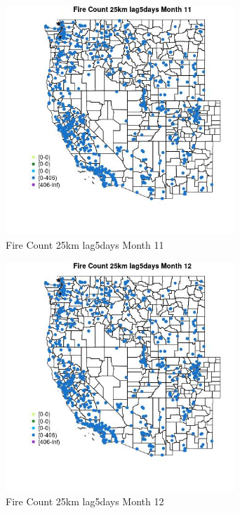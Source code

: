 \begin{figure} 
\centering  
\includegraphics[width=0.77\textwidth]{Code_Outputs/Report_ML_input_PM25_Step4_part_f_de_duplicated_aveswNAs_MapObsMo11Fire_Count_25km_lag5days.jpg} 
\caption{\label{fig:Report_ML_input_PM25_Step4_part_f_de_duplicated_aveswNAsMapObsMo11Fire_Count_25km_lag5days}Fire Count 25km lag5days Month 11} 
\end{figure} 
 

\begin{figure} 
\centering  
\includegraphics[width=0.77\textwidth]{Code_Outputs/Report_ML_input_PM25_Step4_part_f_de_duplicated_aveswNAs_MapObsMo12Fire_Count_25km_lag5days.jpg} 
\caption{\label{fig:Report_ML_input_PM25_Step4_part_f_de_duplicated_aveswNAsMapObsMo12Fire_Count_25km_lag5days}Fire Count 25km lag5days Month 12} 
\end{figure} 
 

